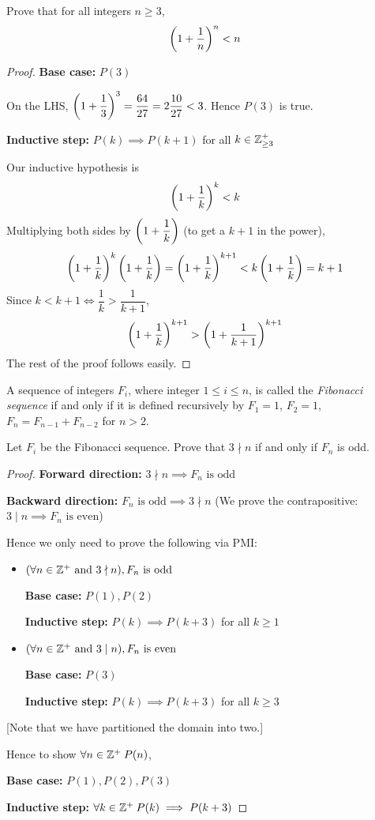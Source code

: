 \begin{prbm}
Prove that for all integers $n \ge 3$, 
\[ \left(1+\frac{1}{n}\right)^n<n \]
\end{prbm}

\begin{proof}
\textbf{Base case:} $P(3)$

On the LHS, $\left(1+\dfrac{1}{3}\right)^3=\dfrac{64}{27}=2\dfrac{10}{27}<3$. Hence $P(3)$ is true.

\textbf{Inductive step:} $P(k)\implies P(k+1)$ for all $k\in\mathbb Z^+_{\ge3}$

Our inductive hypothesis is
\[ \left(1+\frac{1}{k}\right)^k<k \]
Multiplying both sides by $\left(1+\dfrac{1}{k}\right)$ (to get a $k+1$ in the power),
\[ \left(1+\frac{1}{k}\right)^k\left(1+\frac{1}{k}\right)=\left(1+\frac{1}{k}\right)^{k+1}<k\left(1+\frac{1}{k}\right)=k+1  \]
Since $k<k+1 \iff \dfrac{1}{k}>\dfrac{1}{k+1}$, 
\[ \left(1+\frac{1}{k}\right)^{k+1} > \left(1+\frac{1}{k+1}\right)^{k+1} \]
The rest of the proof follows easily.
\end{proof}

A sequence of integers $F_i$, where integer $1\le i\le n$, is called the \emph{Fibonacci sequence} if and only if it is defined recursively by $F_1=1$, $F_2=1$, $F_n=F_{n-1}+F_{n-2}$ for $n>2$.

\begin{prbm}
Let $F_i$ be the Fibonacci sequence. Prove that $3\nmid n$ if and only if $F_n$ is odd.
\end{prbm}

\begin{proof}
\textbf{Forward direction:} $3\nmid n \implies F_n \text{ is odd}$

\textbf{Backward direction:} $F_n \text{ is odd} \implies 3\nmid n$ (We prove the contrapositive: $3\mid n \implies F_n \text{ is even}$)

Hence we only need to prove the following via PMI:
\begin{itemize}
\item $(\forall n\in\mathbb Z^+\text{ and }3\nmid n), F_n\text{ is odd}$

\textbf{Base case:} $P(1),P(2)$

\textbf{Inductive step:} $P(k)\implies P(k+3)$ for all $k\ge1$

\item $(\forall n\in\mathbb Z^+\text{ and }3\mid n), F_n\text{ is even}$

\textbf{Base case:} $P(3)$

\textbf{Inductive step:} $P(k)\implies P(k+3)$ for all $k\ge3$
\end{itemize}
[Note that we have partitioned the domain into two.]

Hence to show $\forall n\in\mathbb Z^+\:P(n)$,

\textbf{Base case:} $P(1),P(2),P(3)$

\textbf{Inductive step:} $\forall k\in\mathbb Z^+\:P(k)\implies P(k+3)$
\end{proof}
\pagebreak

